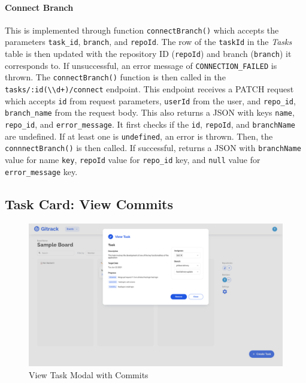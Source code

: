 \documentclass{article}
\def\code#1{\texttt{#1}}
\begin{document}
\paragraph{Connect Branch}
This is implemented through function \code{connectBranch()} which accepts the
parameters \code{task\_id}, \code{branch}, and \code{repoId}. The row of the
\code{taskId} in the \emph{Tasks} table is then updated with the repository ID
(\code{repoId}) and branch (\code{branch}) it corresponds to. If unsuccessful,
an error message of \code{CONNECTION\_FAILED} is thrown. The
\code{connectBranch()} function is then called in the
\code{tasks/:id(\textbackslash{}\textbackslash{}d+)/connect} endpoint. This
endpoint receives a PATCH request which accepts \code{id} from request
parameters, \code{userId} from the user, and \code{repo\_id},
\code{branch\_name} from the request body. This also returns a JSON with keys
\code{name}, \code{repo\_id}, and \code{error\_message}. It first checks if the
\code{id}, \code{repoId}, and \code{branchName} are undefined. If at least one
is \code{undefined}, an error is thrown. Then, the \code{connnectBranch()} is
then called. If successful, returns a JSON with \code{branchName} value for name
\code{key}, \code{repoId} value for \code{repo\_id} key, and \code{null} value
for \code{error\_message} key.


\subsection{Task Card: View Commits}
\begin{figure}[H]
	\includegraphics[width=1\textwidth]{view-task-commit}\par\vspace{0.5cm}
	\caption{View Task Modal with Commits}
	\label{fig:view-task-commit}
\end{figure}
\end{document}
